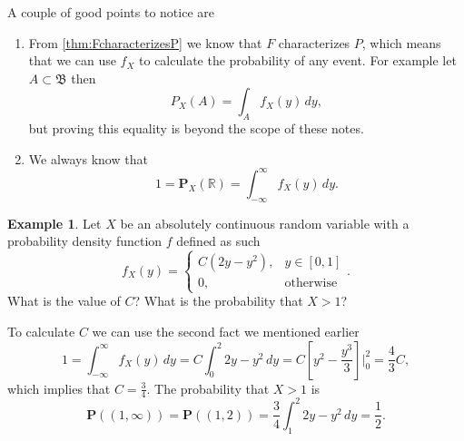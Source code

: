 \documentclass[11pt,a4paper]{article}
\theoremstyle{definition}
\newtheorem{example}{Example}[section]
\theoremstyle{plain}
\newcommand{\R}{\mathbb{R}}
\begin{document}
  A couple of good points to notice are
  \begin{enumerate}
    \item From \autoref{thm:FcharacterizesP} we know that $F$ characterizes $P$,
    which means that we can use $f_X$ to calculate the probability of any
    event. For example let $A \subset \mathfrak B$ then
    \[
      P_X(A) = \int_{A} f_X(y)\,dy,
    \]
    but proving this equality is beyond the scope of these notes.
    \item We always know that
    \[
      1 = \mathbf P_X(\R) = \int_{-\infty}^{\infty} f_X(y)\,dy.
    \]
  \end{enumerate}

  \begin{example}
    Let $X$ be an absolutely continuous random variable with a probability
    density function $f$ defined as such
    \[
      f_X(y) =
      \begin{cases}
        C(2y - y^2), &y \in [0,1] \\
        0, &\text{otherwise}
      \end{cases}.
    \]
    What is the value of $C$? What is the probability that $X > 1$?

    To calculate $C$ we can use the second fact we mentioned earlier
    \[
      1 =
      \int_{-\infty}^{\infty} f_X(y)\,dy =
      C \int_{0}^{2} 2y - y^2\,dy =
      C\left[y^2 - \frac{y^3}{3}\right]\biggr\vert_{0}^{2} =
      \frac{4}{3} C,
    \]
    which implies that $C = \frac{3}{4}$. The probability that $X > 1$ is
    \[
      \mathbf P\left((1,\infty)\right) =
      \mathbf P\left((1,2)\right) =
      \frac{3}{4} \int_{1}^{2} 2y - y^2\,dy =
      \frac{1}{2}.
    \]
  \end{example}
\end{document}
